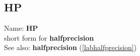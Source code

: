 \subsection{HP}
\label{labhp}
\noindent Name: \textbf{HP}\\
\phantom{aaa}short form for \textbf{halfprecision}\\[0.2cm]
See also: \textbf{halfprecision} (\ref{labhalfprecision})
